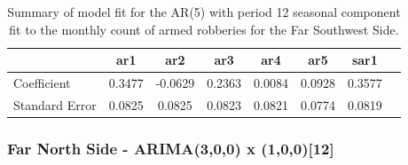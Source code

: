 \documentclass{article} %
\begin{document}
 
 \begin{table}[h]
	\label{tab:data}
	\begin{center}
	\begin{tabular}{lccccccc}
			\hline
			&           ar1  &   ar2  & ar3 & ar4 & ar5 &  sar1    \\\hline
Coefficient   &    0.3477  &-0.0629 & 0.2363 & 0.0084  &0.0928 & 0.3577   \\
Standard Error & 0.0825  & 0.0825 & 0.0823 & 0.0821 & 0.0774  & 0.0819 \\ 
		\end{tabular}
	\caption{Summary of model fit for the AR(5) with period 12 seasonal component fit to the monthly count of armed robberies for the Far Southwest Side.}
	\end{center}
\end{table}

 \break
 \newpage
 
\subsubsection{Far North Side - ARIMA(3,0,0) x (1,0,0)[12]}
 
\end{document}
